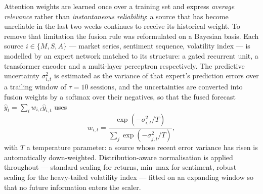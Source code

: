 Attention weights are learned once over a training set and express \emph{average relevance}
rather than \emph{instantaneous reliability}: a source that has become unreliable in the last
two weeks continues to receive its historical weight. To remove that limitation the fusion rule
was reformulated on a Bayesian basis. Each source $i \in \{M, S, A\}$ --- market series,
sentiment sequence, volatility index --- is modelled by an expert network matched to its
structure: a gated recurrent unit, a transformer encoder and a multi-layer perceptron
respectively. The predictive uncertainty $\sigma_{i,t}^2$ is estimated as the variance of that
expert's prediction errors over a trailing window of $\tau = 10$ sessions, and the
uncertainties are converted into fusion weights by a softmax over their negatives, so that the
fused forecast $\hat{y}_t = \sum_i w_{i,t}\hat{y}_{i,t}$ uses
\begin{equation}
w_{i,t} = \frac{\exp\!\left(-\sigma_{i,t}^2 / T\right)}
               {\sum_j \exp\!\left(-\sigma_{j,t}^2 / T\right)},
\end{equation}
with $T$ a temperature parameter: a source whose recent error variance has risen is
automatically down-weighted. Distribution-aware normalisation is applied throughout ---
standard scaling for returns, min--max for sentiment, robust scaling for the heavy-tailed
volatility index --- fitted on an expanding window so that no future information enters the
scaler.


